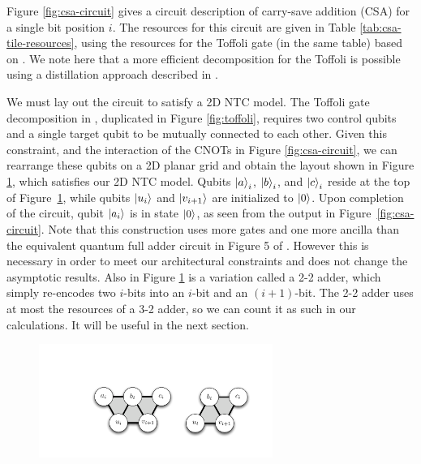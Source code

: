 \documentclass[twoside]{article}
\begin{document}
Figure \ref{fig:csa-circuit} gives a circuit description of carry-save addition (CSA) for a single bit position $i$.
The resources for this circuit are given in Table \ref{tab:csa-tile-resources}, using
the resources for the Toffoli gate (in the same table) based on
\cite{Amy2012}. We note here
that a more efficient decomposition for the Toffoli is possible using a
distillation approach described in \cite{Jones2013a}.

We must lay out the circuit to satisfy a 2D NTC model.
The Toffoli gate decomposition in \cite{Amy2012}, duplicated in
Figure \ref{fig:toffoli}, requires two control
qubits and a single target qubit to be
mutually connected to each other. Given this constraint, and the
interaction of the CNOTs in Figure \ref{fig:csa-circuit}, we can
rearrange these qubits on a 2D planar grid and obtain the layout shown
in Figure \ref{fig:csa-3-2}, which satisfies our 2D NTC model.
Qubits $\left\vert{a}\right\rangle_i$, $\left\vert{b}\right\rangle_i$, and $\left\vert{c}\right\rangle_i$ reside at the top of Figure~\ref{fig:csa-3-2}, while qubits $\left\vert{u_i}\right\rangle$ and $\left\vert{v_{i+1}}\right\rangle$ are initialized to $\left\vert{0}\right\rangle$.
Upon completion of the circuit, qubit $\left\vert{a_i}\right\rangle$ is in state $\left\vert{0}\right\rangle$, as seen from the output in Figure~\ref{fig:csa-circuit}. 
Note that this construction uses more gates and one more ancilla than the equivalent
quantum full adder circuit in Figure 5 of \cite{Gossett1998}. However this
is necessary in order to meet our architectural constraints and does not change the
asymptotic results.
Also in Figure \ref{fig:csa-3-2}
is a variation called a 2-2 adder, which simply re-encodes two $i$-bits
into an $i$-bit and an $(i+1)$-bit. The 2-2 adder uses at most the resources
of a 3-2 adder, so we can count it as such in our calculations.
It will be useful in the next section.

\begin{figure}[b!]
\begin{center}
\includegraphics[width=3in]{./csa-32-22.pdf}
\end{center}
\label{fig:csa-3-2}
\end{figure}
\end{document}
